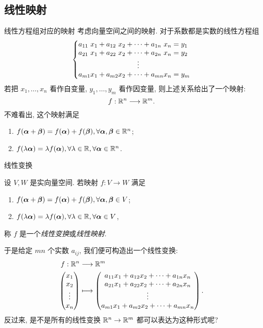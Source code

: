 \subsection{线性映射}
\begin{frame}{线性方程组对应的映射\noexer}
	\onslide<+->
	考虑向量空间之间的映射.
	\onslide<+->
	对于系数都是实数的线性方程组
	\[\laeq[lclcclcl]{
		a_{11}&x_1+{}&a_{12}&x_2&{}+\cdots+{}&a_{1n}&x_n={}&y_1\\
		a_{21}&x_1+{}&a_{22}&x_2&{}+\cdots+{}&a_{2n}&x_n={}&y_2\\
		&&&&\vdots&&&\\
		a_{m1}&x_1+{}&a_{m2}&x_2&{}+\cdots+{}&a_{mn}&x_n={}&y_m
	}\]
	\onslide<+->
	若把 $x_1,\dots,x_n$ 看作自变量, $y_1,\dots,y_m$ 看作因变量, 则上述关系给出了一个映射:
	\[f:{\mathbb{R}}^n\longrightarrow{\mathbb{R}}^m.\]
	\onslide<+->
	不难看出, 这个映射满足
	\begin{enumerate}
		\item $f({\boldsymbol{\alpha}}+{\boldsymbol{\beta}})=f({\boldsymbol{\alpha}})+f({\boldsymbol{\beta}}),\forall {\boldsymbol{\alpha}},{\boldsymbol{\beta}}\in {\mathbb{R}}^n$;
		\item $f(\lambda {\boldsymbol{\alpha}})=\lambda f({\boldsymbol{\alpha}}),\forall \lambda\in{\mathbb{R}},\forall{\boldsymbol{\alpha}}\in {\mathbb{R}}^n$.
	\end{enumerate}
\end{frame}


\begin{frame}{线性变换\noexer}
	\onslide<+->
	\begin{definition}[线性变换]
		设 $V,W$ 是实向量空间.
		若映射 $f:V\to W$ 满足
		\begin{enumerate}[<*>]
			\item $f({\boldsymbol{\alpha}}+{\boldsymbol{\beta}})=f({\boldsymbol{\alpha}})+f({\boldsymbol{\beta}}),\forall {\boldsymbol{\alpha}},{\boldsymbol{\beta}}\in V$;
			\item $f(\lambda {\boldsymbol{\alpha}})=\lambda f({\boldsymbol{\alpha}}),\forall \lambda\in{\mathbb{R}},\forall{\boldsymbol{\alpha}}\in V$,
		\end{enumerate}
		称 $f$ 是一个\emph{线性变换}或\emph{线性映射}.
	\end{definition}
	\onslide<+->
	于是给定 $mn$ 个实数 $a_{ij}$, 我们便可构造出一个线性变换:
	\onslide<+->
	\begin{align*}
		f:\BR^n&\lra\BR^m\\
		\begin{pmatrix}
			x_1\\
			x_2\\
			\vdots\\
			x_n
		\end{pmatrix}&\lto
		\begin{pmatrix}
			a_{11}x_1+a_{12}x_2+\cdots+a_{1n}x_n\\
			a_{21}x_1+a_{22}x_2+\cdots+a_{2n}x_n\\
			\vvdots\\
			a_{m1}x_1+a_{m2}x_2+\cdots+a_{mn}x_n
		\end{pmatrix}.
	\end{align*}
	\onslide<+->
	反过来, 是不是所有的线性变换 ${\mathbb{R}}^n\rightarrow{\mathbb{R}}^m$ 都可以表达为这种形式呢?
\end{frame}


